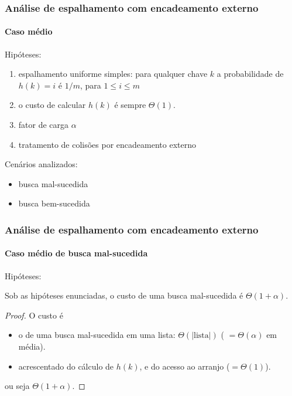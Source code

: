 \documentclass{beamer}
\begin{document}
\begin{frame}

  \frametitle{Análise de espalhamento com encadeamento externo}
  \framesubtitle{Caso médio}

  Hipóteses:

  \begin{enumerate}

  \item \alert{espalhamento uniforme simples}: para qualquer chave $k$ a
    probabilidade de $h(k) = i$ é $1/m$, para $1 \le i \le m$

  \item o custo de calcular $h(k)$ é sempre $\Theta(1)$.

  \item fator de carga $\alpha$

  \item tratamento de colisões por encadeamento externo

  \end{enumerate}

  Cenários analizados:

  \begin{itemize}

    \item busca mal-sucedida

    \item busca bem-sucedida

  \end{itemize}

\end{frame}

\begin{frame}

  \frametitle{Análise de espalhamento com encadeamento externo}
  \framesubtitle{Caso médio de busca mal-sucedida}

  Hipóteses:

  \begin{theorem}

    Sob as hipóteses enunciadas, o custo de uma busca mal-sucedida é $\Theta(1+\alpha)$.

  \end{theorem}

  \pause

  \begin{proof}

  O custo é
  \begin{itemize}

    \item o de uma busca mal-sucedida em uma lista: $\Theta(| \text{lista} |)$ ( $= \Theta( \alpha )$ em média).

    \item acrescentado do cálculo de $h(k)$, e do acesso ao arranjo ($= \Theta(1)$).

  \end{itemize}
  ou seja $\Theta(1 + \alpha)$.

  \end{proof}
\end{frame}
\end{document}
